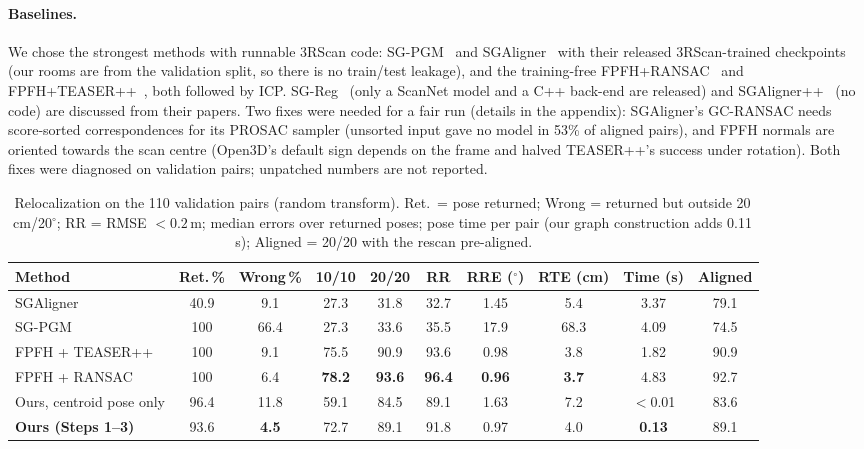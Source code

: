 \documentclass[11pt, a4paper]{article}
\begin{document}
\paragraph{Baselines.} We chose the strongest methods with runnable 3RScan code: SG-PGM~\cite{xie2024sgpgm} and
SGAligner~\cite{sarkar2023sgaligner} with their released 3RScan-trained checkpoints (our rooms are from the validation
split, so there is no train/test leakage), and the training-free FPFH+RANSAC~\cite{rusu2009fpfh,fischler1981ransac} and
FPFH+TEASER++~\cite{yang2021teaser}, both followed by ICP. SG-Reg~\cite{liu2025sgreg} (only a ScanNet model and a C++
back-end are released) and SGAligner++~\cite{singh2025sgalignerpp} (no code) are discussed from their papers. Two fixes
were needed for a fair run (details in the appendix): SGAligner's GC-RANSAC needs score-sorted correspondences for
its PROSAC sampler (unsorted input gave no model in 53\% of aligned pairs), and FPFH normals are oriented towards the scan
centre (Open3D's default sign depends on the frame and halved TEASER++'s success under rotation). Both fixes were
diagnosed on validation pairs; unpatched numbers are not reported.

\begin{table}[t]
\centering\small
\caption{Relocalization on the 110 validation pairs (random transform). Ret.\ = pose returned; Wrong = returned but
outside 20\,cm/20$^\circ$; RR = RMSE $<0.2$\,m; median errors over returned poses; pose time per pair (our graph
construction adds 0.11\,s); Aligned = 20/20 with the rescan pre-aligned.}
\label{tab:results}
\setlength{\tabcolsep}{3pt}
\begin{tabular}{@{}lccccccccc@{}}
\toprule
Method & Ret.\,\% & Wrong\,\% & 10/10 & 20/20 & RR & RRE ($^\circ$) & RTE (cm) & Time (s) & Aligned \\
\midrule
SGAligner~\cite{sarkar2023sgaligner} & 40.9 & 9.1 & 27.3 & 31.8 & 32.7 & 1.45 & 5.4 & 3.37 & 79.1 \\
SG-PGM~\cite{xie2024sgpgm} & 100 & 66.4 & 27.3 & 33.6 & 35.5 & 17.9 & 68.3 & 4.09 & 74.5 \\
\midrule
FPFH + TEASER++~\cite{yang2021teaser} & 100 & 9.1 & 75.5 & 90.9 & 93.6 & 0.98 & 3.8 & 1.82 & 90.9 \\
FPFH + RANSAC~\cite{rusu2009fpfh} & 100 & 6.4 & \textbf{78.2} & \textbf{93.6} & \textbf{96.4} & \textbf{0.96} & \textbf{3.7} & 4.83 & 92.7 \\
\midrule
Ours, centroid pose only & 96.4 & 11.8 & 59.1 & 84.5 & 89.1 & 1.63 & 7.2 & $<$0.01 & 83.6 \\
\textbf{Ours (Steps 1--3)} & 93.6 & \textbf{4.5} & 72.7 & 89.1 & 91.8 & 0.97 & 4.0 & \textbf{0.13} & 89.1 \\
\bottomrule
\end{tabular}
\end{table}
\end{document}
